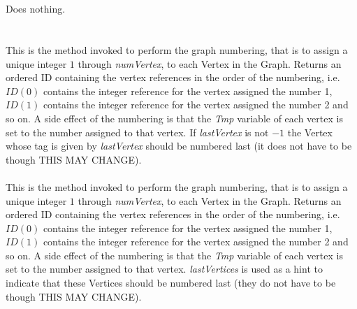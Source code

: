   \\
  \\
Does nothing. \\

  \\
\\
This is the method invoked to perform the graph numbering, that is to
assign a unique integer $1$ through {\em numVertex}, to each Vertex in
the Graph. Returns an ordered ID containing the vertex references in the order
of the numbering, i.e. $ID(0)$ contains the integer reference for the
vertex assigned the number 1, $ID(1)$ contains the integer reference for the
vertex assigned the number 2 and so on. A side effect of the numbering
is that the {\em Tmp} variable of each vertex is set to the number
assigned to that vertex. If {\em lastVertex} is not $-1$ the Vertex
whose tag is given by {\em lastVertex} should be numbered last (it
does not have to be though THIS MAY CHANGE).\\

\\
This is the method invoked to perform the graph numbering, that is to
assign a unique integer $1$ through {\em numVertex}, to each Vertex in
the Graph. Returns an ordered ID containing the vertex references in the order
of the numbering, i.e. $ID(0)$ contains the integer reference for the
vertex assigned the number 1, $ID(1)$ contains the integer reference for the
vertex assigned the number 2 and so on. A side effect of the numbering
is that the {\em Tmp} variable of each vertex is set to the number
assigned to that vertex. {\em lastVertices} is used as a hint to
indicate that these Vertices should be numbered last (they do not have
to be though THIS MAY CHANGE).






